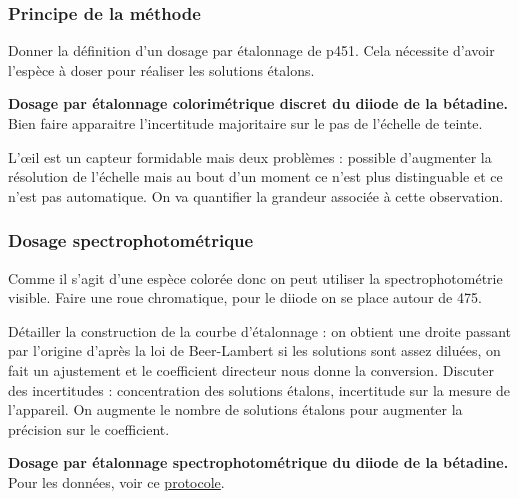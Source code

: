 \subsubsection{Principe de la méthode}

Donner la définition d'un dosage par étalonnage de \cite{Prevost2012} p451. Cela nécessite d'avoir l'espèce à doser pour réaliser les solutions étalons.

\begin{experience}
\textbf{Dosage par étalonnage colorimétrique discret du diiode de la bétadine.}
Bien faire apparaitre l'incertitude majoritaire sur le pas de l'échelle de teinte.
\end{experience}

\begin{transition}
L'œil est un  capteur formidable mais deux problèmes : possible d'augmenter la résolution de l'échelle mais au bout d'un moment ce n'est plus distinguable et ce n'est pas automatique.
On va quantifier la grandeur associée à cette observation.
\end{transition}

\subsubsection{Dosage spectrophotométrique}

Comme il s'agit d'une espèce colorée donc on peut utiliser la spectrophotométrie visible.
Faire une roue chromatique, pour le diiode on se place autour de \unit{475}{\nano\meter}.

Détailler la construction de la courbe d'étalonnage : on obtient une droite passant par l'origine d'après la loi de Beer-Lambert si les solutions sont assez diluées, on fait un ajustement et le coefficient directeur nous donne la conversion.
Discuter des incertitudes : concentration des solutions étalons, incertitude sur la mesure de l'appareil. 
On augmente le nombre de solutions étalons pour augmenter la précision sur le coefficient.

\begin{experience}
\textbf{Dosage par étalonnage spectrophotométrique du diiode de la bétadine.}
Pour les données, voir ce \href{https://www.google.com/url?sa=t&rct=j&q=&esrc=s&source=web&cd=3&cad=rja&uact=8&ved=2ahUKEwiX1umml8DpAhVrxYUKHccoBeoQFjACegQIAxAB&url=https\%3A\%2F\%2Fphysiquelevavasseur.jimdofree.com\%2Fapp\%2Fdownload\%2F6817364013\%2Fcorrection\%2BTP\%2Bn\%25C2\%25B02\%2BLe\%2Bdosage\%2Bpar\%2B\%25C3\%25A9talonnage\%2Bspectrophotom\%25C3\%25A9trique-Corrig\%25C3\%25A9.pdf\%3Ft\%3D1568184708&usg=AOvVaw0GoXYVACltYyetD0MZWvA1}{protocole}.
\end{experience}

